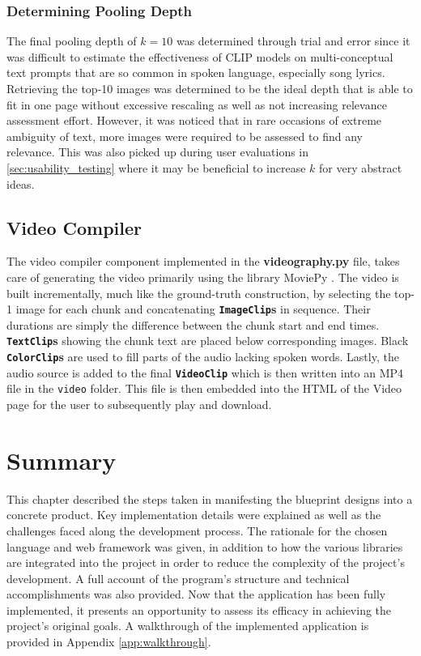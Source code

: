 \documentclass{l4proj}
\begin{document}
\subsubsection{Determining Pooling Depth}
\label{sec:determining_pool_depth}
The final pooling depth of $k=10$ was determined through trial and error since it was difficult to estimate the effectiveness of CLIP models on multi-conceptual text prompts that are so common in spoken language, especially song lyrics. Retrieving the top-10 images was determined to be the ideal depth that is able to fit in one page without excessive rescaling as well as not increasing relevance assessment effort. However, it was noticed that in rare occasions of extreme ambiguity of text, more images were required to be assessed to find any relevance. This was also picked up during user evaluations in \ref{sec:usability_testing} where it may be beneficial to increase $k$ for very abstract ideas.


\subsection{Video Compiler}
The video compiler component implemented in the \textbf{videography.py} file, takes care of generating the video primarily using the library MoviePy \citep{moviepy}. The video is built incrementally, much like the ground-truth construction, by selecting the top-1 image for each chunk and concatenating \textbf{\lstinline|ImageClip|s} in sequence. Their durations are simply the difference between the chunk start and end times. \textbf{\lstinline|TextClip|s} showing the chunk text are placed below corresponding images. Black \textbf{\lstinline|ColorClip|s} are used to fill parts of the audio lacking spoken words. Lastly, the audio source is added to the final \textbf{\lstinline|VideoClip|} which is then written into an MP4 file in the \lstinline|video| folder. This file is then embedded into the HTML of the Video page for the user to subsequently play and download.


\section{Summary}
This chapter described the steps taken in manifesting the blueprint designs into a concrete product. Key implementation details were explained as well as the challenges faced along the development process. The rationale for the chosen language and web framework was given, in addition to how the various libraries are integrated into the project in order to reduce the complexity of the project's development. A full account of the program's structure and technical accomplishments was also provided. Now that the application has been fully implemented, it presents an opportunity to assess its efficacy in achieving the project's original goals. A walkthrough of the implemented application is provided in Appendix \ref{app:walkthrough}.
\end{document}
